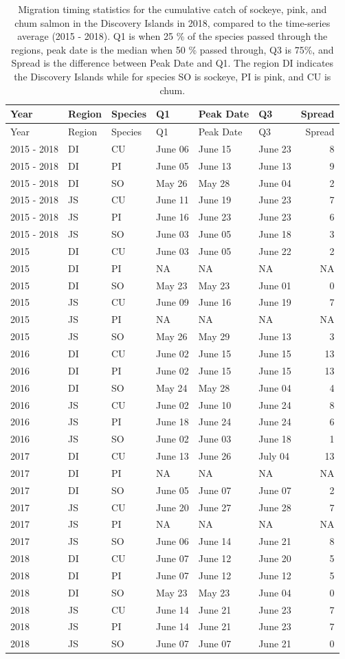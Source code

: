 \documentclass[fleqn,10pt]{wlpeerj} %
\begin{document}
\begin{longtable}[]{@{}llllllr@{}}
\caption{\label{tab:migration-timing-table} Migration timing statistics for the cumulative catch of sockeye, pink, and chum salmon in the Discovery Islands in 2018, compared to the time-series average (2015 - 2018). Q1 is when 25 \% of the species passed through the regions, peak date is the median when 50 \% passed through, Q3 is 75\%, and Spread is the difference between Peak Date and Q1. The region DI indicates the Discovery Islands while for species SO is sockeye, PI is pink, and CU is chum.}\tabularnewline
\toprule
Year & Region & Species & Q1 & Peak Date & Q3 & Spread\tabularnewline
\midrule
\endfirsthead
\toprule
Year & Region & Species & Q1 & Peak Date & Q3 & Spread\tabularnewline
\midrule
\endhead
2015 - 2018 & DI & CU & June 06 & June 15 & June 23 & 8\tabularnewline
2015 - 2018 & DI & PI & June 05 & June 13 & June 13 & 9\tabularnewline
2015 - 2018 & DI & SO & May 26 & May 28 & June 04 & 2\tabularnewline
2015 - 2018 & JS & CU & June 11 & June 19 & June 23 & 7\tabularnewline
2015 - 2018 & JS & PI & June 16 & June 23 & June 23 & 6\tabularnewline
2015 - 2018 & JS & SO & June 03 & June 05 & June 18 & 3\tabularnewline
2015 & DI & CU & June 03 & June 05 & June 22 & 2\tabularnewline
2015 & DI & PI & NA & NA & NA & NA\tabularnewline
2015 & DI & SO & May 23 & May 23 & June 01 & 0\tabularnewline
2015 & JS & CU & June 09 & June 16 & June 19 & 7\tabularnewline
2015 & JS & PI & NA & NA & NA & NA\tabularnewline
2015 & JS & SO & May 26 & May 29 & June 13 & 3\tabularnewline
2016 & DI & CU & June 02 & June 15 & June 15 & 13\tabularnewline
2016 & DI & PI & June 02 & June 15 & June 15 & 13\tabularnewline
2016 & DI & SO & May 24 & May 28 & June 04 & 4\tabularnewline
2016 & JS & CU & June 02 & June 10 & June 24 & 8\tabularnewline
2016 & JS & PI & June 18 & June 24 & June 24 & 6\tabularnewline
2016 & JS & SO & June 02 & June 03 & June 18 & 1\tabularnewline
2017 & DI & CU & June 13 & June 26 & July 04 & 13\tabularnewline
2017 & DI & PI & NA & NA & NA & NA\tabularnewline
2017 & DI & SO & June 05 & June 07 & June 07 & 2\tabularnewline
2017 & JS & CU & June 20 & June 27 & June 28 & 7\tabularnewline
2017 & JS & PI & NA & NA & NA & NA\tabularnewline
2017 & JS & SO & June 06 & June 14 & June 21 & 8\tabularnewline
2018 & DI & CU & June 07 & June 12 & June 20 & 5\tabularnewline
2018 & DI & PI & June 07 & June 12 & June 12 & 5\tabularnewline
2018 & DI & SO & May 23 & May 23 & June 04 & 0\tabularnewline
2018 & JS & CU & June 14 & June 21 & June 23 & 7\tabularnewline
2018 & JS & PI & June 14 & June 21 & June 23 & 7\tabularnewline
2018 & JS & SO & June 07 & June 07 & June 21 & 0\tabularnewline
\bottomrule
\end{longtable}
\end{document}
